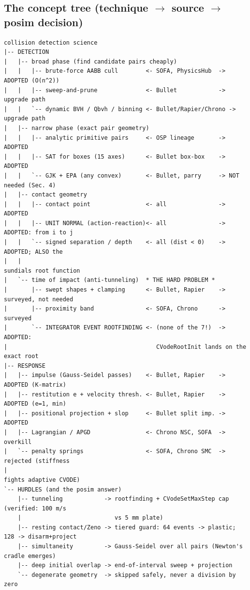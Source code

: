 \documentclass[11pt]{article}
\begin{document}
\subsection{The concept tree (technique $\to$ source $\to$ posim decision)}

\begin{lstlisting}
collision detection science
|-- DETECTION
|   |-- broad phase (find candidate pairs cheaply)
|   |   |-- brute-force AABB cull        <- SOFA, PhysicsHub  -> ADOPTED (O(n^2))
|   |   |-- sweep-and-prune              <- Bullet            -> upgrade path
|   |   `-- dynamic BVH / Qbvh / binning <- Bullet/Rapier/Chrono -> upgrade path
|   |-- narrow phase (exact pair geometry)
|   |   |-- analytic primitive pairs     <- OSP lineage       -> ADOPTED
|   |   |-- SAT for boxes (15 axes)      <- Bullet box-box    -> ADOPTED
|   |   `-- GJK + EPA (any convex)       <- Bullet, parry     -> NOT needed (Sec. 4)
|   |-- contact geometry
|   |   |-- contact point                <- all               -> ADOPTED
|   |   |-- UNIT NORMAL (action-reaction)<- all               -> ADOPTED: from i to j
|   |   `-- signed separation / depth    <- all (dist < 0)    -> ADOPTED; ALSO the
|   |                                                            sundials root function
|   `-- time of impact (anti-tunneling)  * THE HARD PROBLEM *
|       |-- swept shapes + clamping      <- Bullet, Rapier    -> surveyed, not needed
|       |-- proximity band               <- SOFA, Chrono      -> surveyed
|       `-- INTEGRATOR EVENT ROOTFINDING <- (none of the 7!)  -> ADOPTED:
|                                           CVodeRootInit lands on the exact root
|-- RESPONSE
|   |-- impulse (Gauss-Seidel passes)    <- Bullet, Rapier    -> ADOPTED (K-matrix)
|   |-- restitution e + velocity thresh. <- Bullet, Rapier    -> ADOPTED (e=1, min)
|   |-- positional projection + slop     <- Bullet split imp. -> ADOPTED
|   |-- Lagrangian / APGD                <- Chrono NSC, SOFA  -> overkill
|   `-- penalty springs                  <- SOFA, Chrono SMC  -> rejected (stiffness
|                                                                fights adaptive CVODE)
`-- HURDLES (and the posim answer)
    |-- tunneling            -> rootfinding + CVodeSetMaxStep cap (verified: 100 m/s
    |                           vs 5 mm plate)
    |-- resting contact/Zeno -> tiered guard: 64 events -> plastic; 128 -> disarm+project
    |-- simultaneity         -> Gauss-Seidel over all pairs (Newton's cradle emerges)
    |-- deep initial overlap -> end-of-interval sweep + projection
    `-- degenerate geometry  -> skipped safely, never a division by zero
\end{lstlisting}
\end{document}
